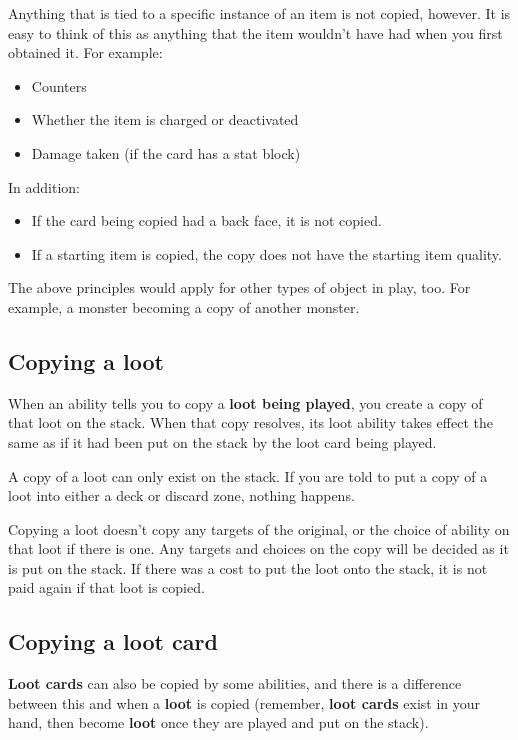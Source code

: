 \documentclass[
  fontsize=10pt,
  paper=a5,
  version=last,
  chapterprefix=true,
  bindingoffset=5mm,
  ]{scrbook}
\begin{document}
    Anything that is tied to a specific instance of an item is not copied, however. It is easy to think of this as anything that the item wouldn’t have had when you first obtained it. For example:

    \begin{itemize}
        \item Counters
        \item Whether the item is charged or deactivated
        \item Damage taken (if the card has a stat block)
    \end{itemize}

    In addition:

    \begin{itemize}
        \item If the card being copied had a back face, it is not copied.
        \item If a starting item is copied, the copy does not have the starting item quality.
    \end{itemize}

    The above principles would apply for other types of object in play, too. For example, a monster becoming a copy of another monster.
    \subsection*{Copying a loot}
    When an ability tells you to copy a \textbf{loot being played}, you create a copy of that loot on the stack. When that copy resolves, its loot ability takes effect the same as if it had been put on the stack by the loot card being played.

    A copy of a loot can only exist on the stack. If you are told to put a copy of a loot into either a deck or discard zone, nothing happens.

    Copying a loot doesn’t copy any targets of the original, or the choice of ability on that loot if there is one. Any targets and choices on the copy will be decided as it is put on the stack. If there was a cost to put the loot onto the stack, it is not paid again if that loot is copied.
    \subsection*{Copying a loot card}
    \textbf{Loot cards} can also be copied by some abilities, and there is a difference between this and when a \textbf{loot} is copied (remember, \textbf{loot cards} exist in your hand, then become \textbf{loot} once they are played and put on the stack).
\end{document}
